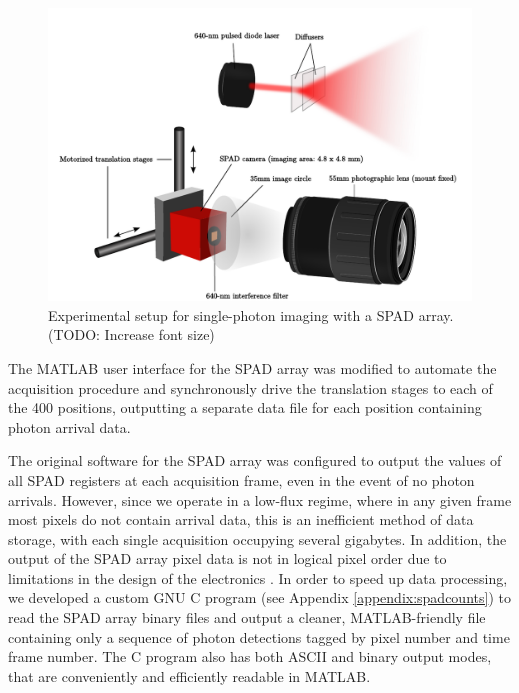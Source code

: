 \begin{figure}[h!]
\centerline{\includegraphics[width=15cm]{figure-first-spad-setup.pdf}}
\caption{Experimental setup for single-photon imaging with a SPAD array. (TODO: Increase font size)}
\label{figure:first-spad-setup}
\end{figure}

The MATLAB user interface for the SPAD array was modified to automate the acquisition procedure and synchronously drive the translation stages to each of the 400 positions, outputting a separate data file for each position containing photon arrival data.

The original software for the SPAD array was configured to output the values of all SPAD registers at each acquisition frame, even in the event of no photon arrivals. However, since we operate in a low-flux regime, where in any given frame most pixels do not contain arrival data, this is an inefficient method of data storage, with each single acquisition occupying several gigabytes. In addition, the output of the SPAD array pixel data is not in logical pixel order due to limitations in the design of the electronics \cite{villa-thesis}. In order to speed up data processing, we developed a custom GNU C program (see Appendix \ref{appendix:spadcounts}) to read the SPAD array binary files and output a cleaner, MATLAB-friendly file containing only a sequence of photon detections tagged by pixel number and time frame number. The C program also has both ASCII and binary output modes, that are conveniently and efficiently readable in MATLAB.

